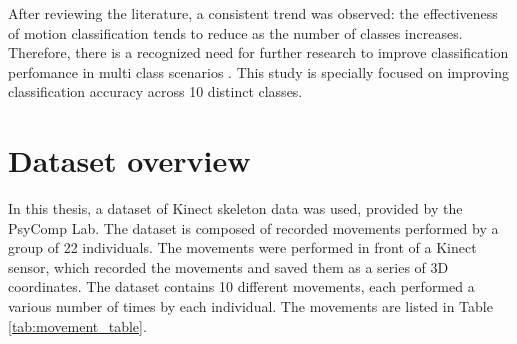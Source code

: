       \vspace{0.5cm}
      After reviewing the literature, a consistent trend was observed: the effectiveness of motion classification tends to reduce as the number of classes increases. Therefore, there is a recognized need for further research to improve classification perfomance in multi class scenarios \cite{acis_classification_2023}. This study is specially focused on improving classification accuracy across 10 distinct classes.

   \section{Dataset overview}
      
      In this thesis, a dataset of Kinect skeleton data was used, provided by the PsyComp Lab. The dataset is composed of recorded movements performed by a group of 22 individuals. The movements were performed in front of a Kinect sensor, which recorded the movements and saved them as a series of 3D coordinates. The dataset contains 10 different movements, each performed a various number of times by each individual. The movements are listed in Table \ref{tab:movement_table}.

      \newpage

